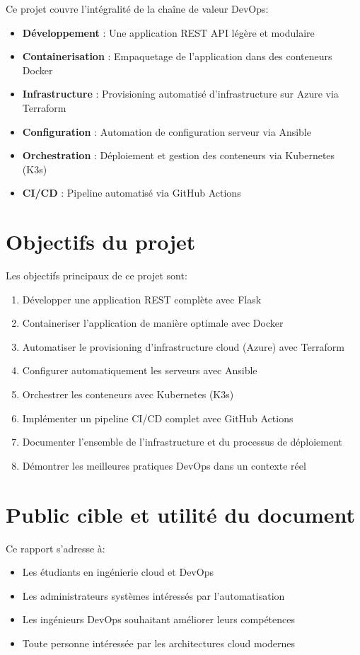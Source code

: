 \documentclass[12pt,a4paper,twoside]{report}
\begin{document}
Ce projet couvre l'intégralité de la chaîne de valeur DevOps:
\begin{itemize}
    \item \textbf{Développement} : Une application REST API légère et modulaire
    \item \textbf{Containerisation} : Empaquetage de l'application dans des conteneurs Docker
    \item \textbf{Infrastructure} : Provisioning automatisé d'infrastructure sur Azure via Terraform
    \item \textbf{Configuration} : Automation de configuration serveur via Ansible
    \item \textbf{Orchestration} : Déploiement et gestion des conteneurs via Kubernetes (K3s)
    \item \textbf{CI/CD} : Pipeline automatisé via GitHub Actions
\end{itemize}

\section{Objectifs du projet}

Les objectifs principaux de ce projet sont:

\begin{enumerate}
    \item Développer une application REST complète avec Flask
    \item Containeriser l'application de manière optimale avec Docker
    \item Automatiser le provisioning d'infrastructure cloud (Azure) avec Terraform
    \item Configurer automatiquement les serveurs avec Ansible
    \item Orchestrer les conteneurs avec Kubernetes (K3s)
    \item Implémenter un pipeline CI/CD complet avec GitHub Actions
    \item Documenter l'ensemble de l'infrastructure et du processus de déploiement
    \item Démontrer les meilleures pratiques DevOps dans un contexte réel
\end{enumerate}

\section{Public cible et utilité du document}

Ce rapport s'adresse à:
\begin{itemize}
    \item Les étudiants en ingénierie cloud et DevOps
    \item Les administrateurs systèmes intéressés par l'automatisation
    \item Les ingénieurs DevOps souhaitant améliorer leurs compétences
    \item Toute personne intéressée par les architectures cloud modernes
\end{itemize}
\end{document}
